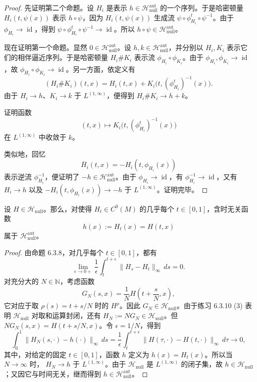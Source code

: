 \begin{proof}
先证明第二个命题。设 $H_i$ 是表示
$h\in\mathcal H_{\mathrm{null}}^{\mathrm{aut}}$ 的一个序列。于是哈密顿量
$H_i(t,\psi(x))$ 表示 $h\circ\psi$，因为
$H_i(t,\psi(x))$ 生成流
$\psi\circ\phi_{H_i}^t\circ\psi^{-1}$。由于
$\phi_{H_i}\to\operatorname{id}$，得到
$\psi\circ\phi_{H_i}^t\circ\psi^{-1}\to\operatorname{id}$。所以
$h\circ\psi\in\mathcal H_{\mathrm{null}}^{\mathrm{aut}}$。

现在证明第一个命题。显然
$0\in\mathcal H_{\mathrm{null}}^{\mathrm{aut}}$。设
$h,k\in\mathcal H_{\mathrm{null}}^{\mathrm{aut}}$，并分别以
$H_i,K_i$ 表示它们的相伴逼近序列。于是哈密顿量
$H_i\#K_i$ 表示流 $\phi_{H_i}\circ\phi_{K_i}$。由于
$\phi_{H_i},\phi_{K_i}\to\operatorname{id}$，故
$\phi_{H_i}\circ\phi_{K_i}\to\operatorname{id}$。另一方面，依定义有
\[
 (H_i\#K_i)(t,x)
 =H_i(t,x)+K_i\bigl(t,(\phi_{H_i}^t)^{-1}(x)\bigr).
\]
由于 $H_i\to h$、$K_i\to k$ 于 $L^{(1,\infty)}$，便得到
$H_i\#K_i\to h+k$。

\begin{exercise}\label{ex:composition-hamiltonian-convergence}
证明函数
\[
 (t,x)\longmapsto K_i\bigl(t,(\phi_{H_i}^t)^{-1}(x)\bigr)
\]
在 $L^{(1,\infty)}$ 中收敛于 $k$。
\end{exercise}

类似地，回忆
\[
 \overline H_i(t,x)=-H_i(t,\phi_{H_i}(x))
\]
表示逆流 $\phi_{H_i}^{-1}$，便证明了
$-h\in\mathcal H_{\mathrm{null}}^{\mathrm{aut}}$。由于
$\phi_{H_i}\to\operatorname{id}$，有
$\phi_{H_i}^{-1}\to\operatorname{id}$，又有 $H_i\to h$ 以及
$-H_i(t,\phi_{H_i}(x))\to-h$ 于 $L^{(1,\infty)}$。证明完毕。
\end{proof}

\begin{lemma}\label{lem:null-hamiltonian-time-slice-autonomous}
设 $H\in\mathcal H_{\mathrm{null}}$。那么，对使得
$H_t\in C^0(M)$ 的几乎每个 $t\in[0,1]$，含时无关函数
\[
 h(x):=H_t(x)=H(t,x)
\]
属于 $\mathcal H_{\mathrm{null}}^{\mathrm{aut}}$。
\end{lemma}

\begin{proof}
由命题 6.3.8，对几乎每个 $t\in[0,1]$，都有
\[
 \lim_{\epsilon\to0+}\frac1\epsilon
 \int_t^{t+\epsilon}\|H_s-H_t\|_\infty\,ds=0.
\]
对充分大的 $N\in\mathbb N$，考虑函数
\[
 G_N(s,x)=\frac1N H\left(t+\frac sN,x\right),
\]
它对应于取 $\rho(s)=t+s/N$ 时的 $H^\rho$。因此
$G_N\in\mathcal H_{\mathrm{null}}$。由于练习 6.3.10 (3) 表明
$\mathcal H_{\mathrm{null}}$ 对取和运算封闭，还有
$H_N:=NG_N\in\mathcal H_{\mathrm{null}}$。但
$NG_N(s,x)=H(t+s/N,x)$。令 $\epsilon=1/N$，得到
\[
 \int_0^1\|H_N(s,\mathord\cdot)-h(\mathord\cdot)\|_\infty\,ds
 =\frac1\epsilon\int_t^{t+\epsilon}
 \|H(\tau,\mathord\cdot)-H(t,\mathord\cdot)\|_\infty\,d\tau
 \longrightarrow0,
\]
其中，对给定的固定 $t\in[0,1]$，函数 $h$ 定义为
$h(x)=H_t(x)$。所以当 $N\to\infty$ 时，
$H_N\to h$ 于 $L^{(1,\infty)}$。由于
$\mathcal H_{\mathrm{null}}$ 是 $L^{(1,\infty)}$ 的闭子集，故
$h\in\mathcal H_{\mathrm{null}}$；又因它与时间无关，继而得到
$h\in\mathcal H_{\mathrm{null}}^{\mathrm{aut}}$。
\end{proof}

